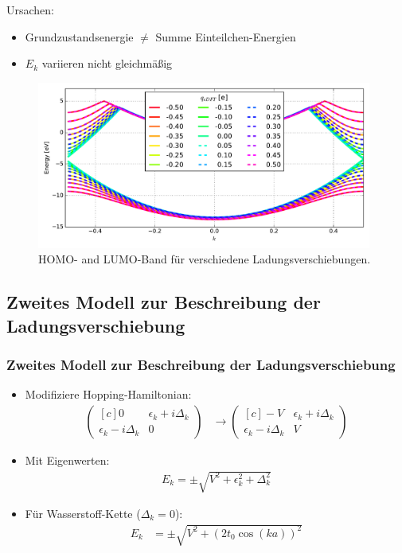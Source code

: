 \begin{frame}
Ursachen:
\begin{itemize}
\item Grundzustandsenergie $\neq$ Summe Einteilchen-Energien
\item $E_k$ variieren nicht gleichmäßig
\end{itemize}
\begin{figure}
\centering
\includegraphics[width = 11cm]{Images/Hydrogen/charging/band_structure_q_1}
\caption{HOMO- and LUMO-Band für verschiedene Ladungsverschiebungen.}
\label{image_hydrogen_charged_bands}
\end{figure}
\end{frame}

\subsection{Zweites Modell zur Beschreibung der Ladungsverschiebung}
\begin{frame}
\frametitle{Zweites Modell zur Beschreibung der Ladungsverschiebung}
\begin{itemize}
\setlength{\itemsep}{.5cm}
\item Modifiziere Hopping-Hamiltonian:
\begin{align*}
\begin{pmatrix*}[c]
0 & \epsilon_k + i \Delta_k \\
\epsilon_k - i \Delta_k & 0
\end{pmatrix*} 
&\to 
\begin{pmatrix*}[c]
-V & \epsilon_k + i \Delta_k \\
\epsilon_k - i \Delta_k & V
\end{pmatrix*}
\end{align*}
\item Mit Eigenwerten:
\begin{align*}
E_k = \pm \sqrt{V^2+\epsilon_k^2+\Delta_k^2}
\end{align*}
\item Für Wasserstoff-Kette ($\Delta_k = 0$):
\begin{align*}
E_k &= \pm \sqrt{V^2 + \left(2t_0\cos(ka)\right)^2}
\end{align*}
\end{itemize}
\end{frame}

